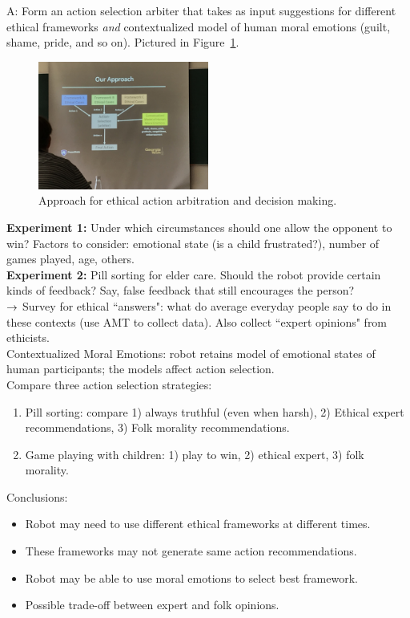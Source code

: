A: Form an action selection arbiter that takes as input suggestions for different ethical frameworks {\it and} contextualized model of human moral emotions (guilt, shame, pride, and so on). Pictured in Figure~\ref{fig:kant}. \\


\begin{figure}[h!]
\centering
\includegraphics[width=0.5\textwidth]{kant.JPG}
\caption{Approach for ethical action arbitration and decision making.}
\label{fig:kant}
\end{figure}

{\bf Experiment 1:} Under which circumstances should one allow the opponent to win? Factors to consider: emotional state (is a child frustrated?), number of games played, age, others. \\

{\bf Experiment 2:} Pill sorting for elder care. Should the robot provide certain kinds of feedback? Say, false feedback that still encourages the person? \\


$\rightarrow$ Survey for ethical ``answers": what do average everyday people say to do in these contexts (use AMT to collect data). Also collect ``expert opinions" from ethicists. \\


Contextualized Moral Emotions: robot retains model of emotional states of human participants; the models affect action selection. \\

Compare three action selection strategies:
\begin{enumerate}
\item Pill sorting: compare 1) always truthful (even when harsh), 2) Ethical expert recommendations, 3) Folk morality recommendations.
\item Game playing with children: 1) play to win, 2) ethical expert, 3) folk morality.
\end{enumerate}


Conclusions:
\begin{itemize}
\item Robot may need to use different ethical frameworks at different times.
\item These frameworks may not generate same action recommendations.
\item Robot may be able to use moral emotions to select best framework.
\item Possible trade-off between expert and folk opinions.
	\end{itemize}

